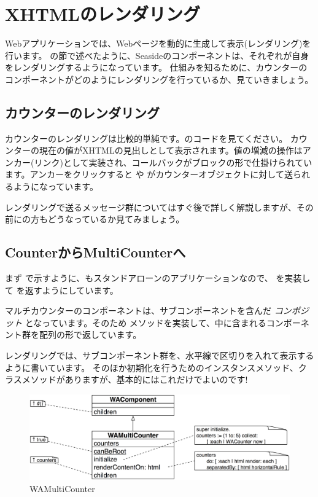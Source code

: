 \documentclass[a4paper,10pt,twoside]{book}
\begin{document}
\section{XHTMLのレンダリング}

Webアプリケーションでは、Webページを動的に生成して表示(レンダリング)を行います。 の節で述べたように、Seasideのコンポーネントは、それぞれが自身をレンダリングするようになっています。
仕組みを知るために、カウンターのコンポーネントがどのようにレンダリングを行っているか、見ていきましょう。

\subsection{カウンターのレンダリング}

カウンターのレンダリングは比較的単純です。のコードを見てください。
カウンターの現在の値がXHTMLの見出しとして表示されます。値の増減の操作はアンカー(リンク)として実装され、コールバックがブロックの形で仕掛けられています。アンカーをクリックすると  や がカウンターオブジェクトに対して送られるようになっています。

レンダリングで送るメッセージ群についてはすぐ後で詳しく解説しますが、その前にの方もどうなっているか見てみましょう。

\subsection{CounterからMultiCounterへ}

まず で示すように、もスタンドアローンのアプリケーションなので、 を実装して を返すようにしています。

マルチカウンターのコンポーネントは、サブコンポーネントを含んだ \emph{コンポジット} となっています。そのため  メソッドを実装して、中に含まれるコンポーネント群を配列の形で返しています。

レンダリングでは、サブコンポーネント群を、水平線で区切りを入れて表示するように書いています。
そのほか初期化を行うためのインスタンスメソッド、クラスメソッドがありますが、基本的にはこれだけでよいのです!

\begin{figure}[bht]
\begin{center}
\includegraphics[width=\textwidth]{WAMultiCounter}
\caption{WAMultiCounter}
\end{center}
\end{figure}
\end{document}

